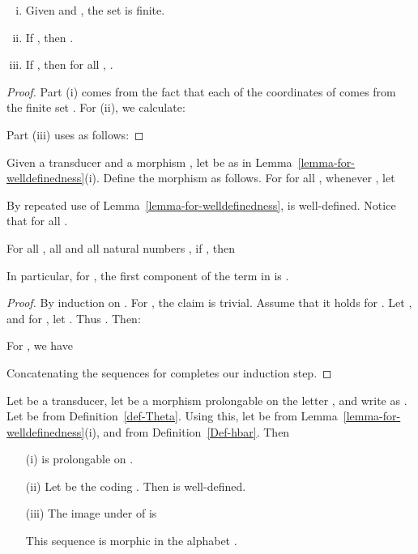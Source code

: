 \begin{lemma}
\begin{enumerate}[(i)]
\item Given  and , the set 
  is finite.
  \item 
 If   , then .
\item  If   , then for all ,  .
\end{enumerate}
\label{lemma-for-welldefinedness}
\end{lemma}

\begin{proof}
Part (i) comes from the fact
that  each of the  coordinates of  comes from the finite set .
For (ii), we calculate:

Part (iii) uses  as follows:

\end{proof}



\begin{definition}[]\label{Def-hbar}
  Given a  transducer  and a morphism , 
  let  be as in Lemma~\ref{lemma-for-welldefinedness}(i).  Define
  the morphism  as follows.
  For for all , whenever , let
  
\end{definition}
By repeated use of Lemma~\ref{lemma-for-welldefinedness},   is well-defined.
Notice that  for all . 

\begin{lemma}\label{lem:hannotate}
  For all , all 
  and all natural numbers , if ,
  then 
   
  In particular, for , the first component of the  term
  in  is . 
\end{lemma}

\begin{proof} By induction on .
  For , the claim is trivial.   Assume that it holds for .
  Let ,
  and  for ,
  let .  Thus
  .
  Then:
  
  For , we have
  
  Concatenating the  sequences 
  for  completes our induction step.
\end{proof}


\begin{lemma}\label{lem:state_annotated_is_morphic}
  Let  be a  transducer, 
  let  be a morphism prolongable on the letter ,   
  and write  as  .
 Let  be from Definition~\ref{def-Theta}.  Using this,
 let   be  from
 Lemma~\ref{lemma-for-welldefinedness}(i), and
   from Definition~\ref{Def-hbar}.    Then
  \begin{enumerate}
  \item[(i)]   is prolongable on  
. 
  \item[(ii)]   Let    be the coding 
.
    Then  is well-defined.
\item[(iii)]  The image under  of 
is
  
This sequence  is morphic in the alphabet .
  \end{enumerate}
\end{lemma}


